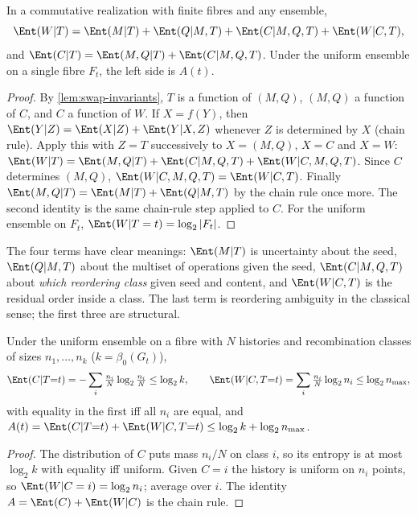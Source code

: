 \begin{theorem}\label{thm:hierarchy}
In a commutative realization with finite fibres and any ensemble,
\[
\Ent(W|T)=\Ent(M|T)+\Ent(Q|M,T)+\Ent(C|M,Q,T)+\Ent(W|C,T),
\]
and $\Ent(C|T)=\Ent(M,Q|T)+\Ent(C|M,Q,T)$. Under the uniform ensemble on a single fibre $F_t$, the left side is $A(t)$.
\end{theorem}
\begin{proof}
By \cref{lem:swap-invariants}, $T$ is a function of $(M,Q)$, $(M,Q)$ a function of $C$, and $C$ a function of $W$. If $X=f(Y)$, then $\Ent(Y|Z)=\Ent(X|Z)+\Ent(Y|X,Z)$ whenever $Z$ is determined by $X$ (chain rule). Apply this with $Z=T$ successively to $X=(M,Q)$, $X=C$ and $X=W$: $\Ent(W|T)=\Ent(M,Q|T)+\Ent(C|M,Q,T)+\Ent(W|C,M,Q,T)$. Since $C$ determines $(M,Q)$, $\Ent(W|C,M,Q,T)=\Ent(W|C,T)$. Finally $\Ent(M,Q|T)=\Ent(M|T)+\Ent(Q|M,T)$ by the chain rule once more. The second identity is the same chain-rule step applied to $C$. For the uniform ensemble on $F_t$, $\Ent(W|T=t)=\log_2|F_t|$.
\end{proof}
The four terms have clear meanings: $\Ent(M|T)$ is uncertainty about the seed, $\Ent(Q|M,T)$ about the multiset of operations given the seed, $\Ent(C|M,Q,T)$ about \emph{which reordering class} given seed and content, and $\Ent(W|C,T)$ is the residual order inside a class. The last term is reordering ambiguity in the classical sense; the first three are structural.

\begin{proposition}\label{prop:class-entropy}
Under the uniform ensemble on a fibre with $N$ histories and recombination classes of sizes $n_1,\dots,n_k$ ($k=\beta_0(G_t)$),
\[
\Ent(C|T{=}t)=-\sum_i\tfrac{n_i}{N}\log_2\tfrac{n_i}{N}\le\log_2k,\qquad \Ent(W|C,T{=}t)=\sum_i\tfrac{n_i}{N}\log_2n_i\le\log_2n_{\max},
\]
with equality in the first iff all $n_i$ are equal, and $A(t)=\Ent(C|T{=}t)+\Ent(W|C,T{=}t)\le\log_2k+\log_2n_{\max}$.
\end{proposition}
\begin{proof}
The distribution of $C$ puts mass $n_i/N$ on class $i$, so its entropy is at most $\log_2k$ with equality iff uniform. Given $C=i$ the history is uniform on $n_i$ points, so $\Ent(W|C=i)=\log_2n_i$; average over $i$. The identity $A=\Ent(C)+\Ent(W|C)$ is the chain rule.
\end{proof}

